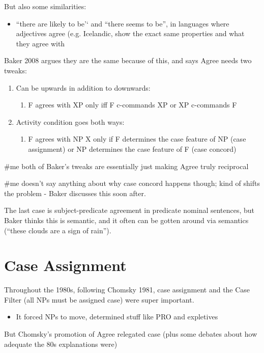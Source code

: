 But also some similarities:

\begin{itemize}
  \item ``there are likely to be'` and ``there seems to be'', in languages where adjectives agree (e.g. Icelandic, show the exact same properties and what they agree with
\end{itemize}

Baker 2008 argues they are the same because of this, and says Agree needs two tweaks:

\begin{enumerate}
  \item Can be upwards in addition to downwards:
  \begin{enumerate}
    \item F agrees with XP only iff F c-commands XP or XP c-commands F
  \end{enumerate}
  \item Activity condition goes both ways:
  \begin{enumerate}
    \item F agrees with NP X only if F determines the case feature of NP (case assignment) or NP determines the case feature of F (case concord)
  \end{enumerate}
\end{enumerate}
\#me both of Baker's tweaks are essentially just making Agree truly reciprocal

\#me doesn't say anything about why case concord happens though; kind of shifts the problem - Baker discusses this soon after.

The last case is subject-predicate agreement in predicate nominal sentences, but Baker thinks this is semantic, and it often can be gotten around via semantics (``these clouds are a sign of rain'').

\section*{Case Assignment}

Throughout the 1980s, following Chomsky 1981, case assignment and the Case Filter (all NPs must be assigned case) were super important.

\begin{itemize}
  \item It forced NPs to move, determined stuff like PRO and expletives
\end{itemize}

But Chomsky's promotion of Agree relegated case (plus some debates about how adequate the 80s explanations were)

